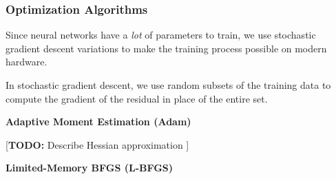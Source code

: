 \begin{frame}
    \frametitle{Optimization Algorithms}

    Since neural networks have a \textit{lot} of parameters to train, we use stochastic gradient descent variations to 
    make the training process possible on modern hardware.

    \bigskip
    \pause

    In stochastic gradient descent, we use random subsets of the training data to compute the gradient of the residual
    in place of the entire set.

    \bigskip
    \pause

    \textbf{Adaptive Moment Estimation (Adam)}
    \ \\
    \bigskip

    [\textbf{TODO:} Describe Hessian approximation ]

    \pause
    \bigskip

    \textbf{Limited-Memory BFGS (L-BFGS)}
    \ \\
\end{frame}